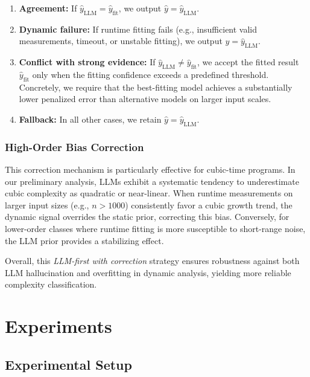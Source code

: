 \documentclass[conference]{IEEEtran}
\begin{document}
 \begin{enumerate} 
     \item \textbf{Agreement:} If $\hat{y}_{\text{LLM}} = \hat{y}_{\text{fit}}$, we output 
     $\hat{y} = \hat{y}_{\text{LLM}}$. 
     \item \textbf{Dynamic failure:} If runtime fitting fails (e.g., insufficient valid measurements, 
     timeout, or unstable fitting), we output $\hat{y} = \hat{y}_{\text{LLM}}$. 
     \item \textbf{Conflict with strong evidence:} If $\hat{y}_{\text{LLM}} \neq \hat{y}_{\text{fit}}$, 
     we accept the fitted result $\hat{y}_{\text{fit}}$ only when the fitting confidence exceeds a 
     predefined threshold. Concretely, we require that the best-fitting model achieves a substantially 
     lower penalized error than alternative models on larger input scales. 
     \item \textbf{Fallback:} In all other cases, we retain $\hat{y} = \hat{y}_{\text{LLM}}$. 
 \end{enumerate} 
 
 \subsubsection{High-Order Bias Correction} 
 \label{subsubsec:high_order} 
 
 This correction mechanism is particularly effective for cubic-time programs. In our preliminary 
 analysis, LLMs exhibit a systematic tendency to underestimate cubic complexity as quadratic or 
 near-linear. When runtime measurements on larger input sizes (e.g., $n > 1000$) consistently favor 
 a cubic growth trend, the dynamic signal overrides the static prior, correcting this bias. Conversely, 
 for lower-order classes where runtime fitting is more susceptible to short-range noise, the LLM prior 
 provides a stabilizing effect. 
 
 Overall, this \emph{LLM-first with correction} strategy ensures robustness against both LLM 
 hallucination and overfitting in dynamic analysis, yielding more reliable complexity classification.

\section{Experiments}
\label{sec:experiments}

\subsection{Experimental Setup} 
 \label{subsec:exp_setup} 
 
\end{document}
